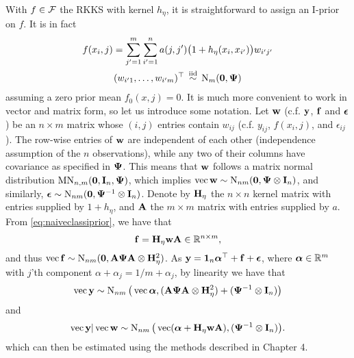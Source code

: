 With $f \in {\mathcal F}$ the RKKS with kernel $h_\eta$, it is straightforward to assign an I-prior on $f$. 
It is in fact
\begin{align}\label{eq:naiveclassiprior}
  \begin{gathered}
    f(x_i,j) = \sum_{j'=1}^m\sum_{i'=1}^n a(j,j')\big(1 + h_\eta(x_i,x_{i'})\big) w_{i'j'} \\
    (w_{i'1},\dots,w_{i'm})^\top \,\overset{\text{iid}}{\sim}\, \operatorname{N}_m({\mathbf 0},{\bm\Psi})
  \end{gathered}
\end{align}
assuming a zero prior mean $f_0(x,j) = 0$.
It is much more  convenient to work in vector and matrix form, so let us introduce some notation.
Let ${\mathbf w}$ (c.f. ${\mathbf y}$, ${\mathbf f}$ and ${\bm\epsilon}$) be an $n \times m$ matrix whose $(i,j)$  entries contain $w_{ij}$ (c.f. $y_{ij}$, $f(x_i,j)$, and $\epsilon_{ij}$).
The row-wise entries of ${\mathbf w}$ are independent of each other (independence assumption of the $n$ observations), while any two of their columns have covariance as specified in ${\bm\Psi}$.
This means that ${\mathbf w}$ follows a matrix normal distribution $ \operatorname{MN}_{n,m}({\mathbf 0}, {\mathbf I}_n,{\bm\Psi})$, which implies $\operatorname{vec} {\mathbf w} \sim \operatorname{N}_{nm}({\mathbf 0}, {\bm\Psi} \otimes {\mathbf I}_n)$, and similarly, ${\bm\epsilon} \sim \operatorname{N}_{nm}({\mathbf 0}, {\bm\Psi}^{-1} \otimes {\mathbf I}_n)$.
Denote by ${\mathbf H}_\eta$ the $n\times n$ kernel matrix with entries supplied by $1 + h_\eta$, and ${\mathbf A}$ the $m\times m$ matrix with entries supplied by $a$.
From \cref{eq:naiveclassiprior}, we have that 
\[
  {\mathbf f} = {\mathbf H}_\eta {\mathbf w} {\mathbf A} \in \mathbb{R}^{n \times m},
\]
and thus $\operatorname{vec} {\mathbf f} \sim \operatorname{N}_{nm}({\mathbf 0}, {\mathbf A}{\bm\Psi}{\mathbf A} \otimes {\mathbf H}_\eta^2)$.
As ${\mathbf y} = {\mathbf 1}_n{\bm\alpha}^\top + {\mathbf f} + {\bm\epsilon}$, where ${\bm\alpha} \in \mathbb{R}^{m}$ with $j$'th component $\alpha + \alpha_j = 1/m + \alpha_j$, by linearity we have that 
\begin{equation}
  \operatorname{vec} {\mathbf y} \sim \operatorname{N}_{nm}\big(\operatorname{vec} {\bm\alpha}, ({\mathbf A}{\bm\Psi}{\mathbf A} \otimes {\mathbf H}_\eta^2) + ({\bm\Psi}^{-1} \otimes {\mathbf I}_n) \big)
\end{equation}
and
\begin{equation}
  \operatorname{vec} {\mathbf y}|\operatorname{vec} {\mathbf w} \sim \operatorname{N}_{nm}\big(\operatorname{vec} ({\bm\alpha}  + {\mathbf H}_\eta {\mathbf w} {\mathbf A}), ({\bm\Psi}^{-1} \otimes {\mathbf I}_n) \big).
\end{equation}
which can then be estimated using the methods described in Chapter 4.

